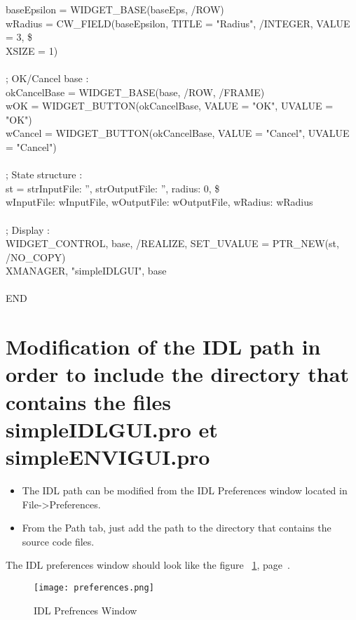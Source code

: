 \begin{scriptsize}
\indent baseEpsilon = WIDGET\_BASE(baseEps, /ROW)\\
\indent wRadius = CW\_FIELD(baseEpsilon, TITLE = "Radius", /INTEGER, VALUE = 3, \$\\
\indent XSIZE = 1)\\
\\
\indent ; OK/Cancel base :\\
\indent okCancelBase = WIDGET\_BASE(base, /ROW, /FRAME)\\
\indent wOK = WIDGET\_BUTTON(okCancelBase, VALUE = "OK", UVALUE = "OK")\\
\indent wCancel = WIDGET\_BUTTON(okCancelBase, VALUE = "Cancel", UVALUE = "Cancel")\\
\\
\indent ; State structure :\\
\indent st = {strInputFile: '', strOutputFile: '', radius: 0, \$\\
\indent wInputFile: wInputFile, wOutputFile: wOutputFile, wRadius: wRadius}\\
\\
\indent ; Display :\\
\indent WIDGET\_CONTROL, base, /REALIZE, SET\_UVALUE = PTR\_NEW(st, /NO\_COPY)\\
\indent XMANAGER, "simpleIDLGUI", base\\
\\
\indent END\\
\end{scriptsize}

\section{Modification of the IDL path in order to include the directory that contains the files simpleIDLGUI.pro et simpleENVIGUI.pro}
\begin{itemize}
    \item The IDL path can be modified from the IDL Preferences window located in File->Preferences. 
    \item From the Path tab, just add the path to the directory that contains the source code files.
\end{itemize}
The IDL preferences window should look like the figure ~\ref{preferences}, page~\pageref{preferences}.

\begin{figure}
\label{preferences}
\begin{center}
\texttt{[image: preferences.png]}
\caption{IDL Prefrences Window}
\end{center}
\end{figure}



